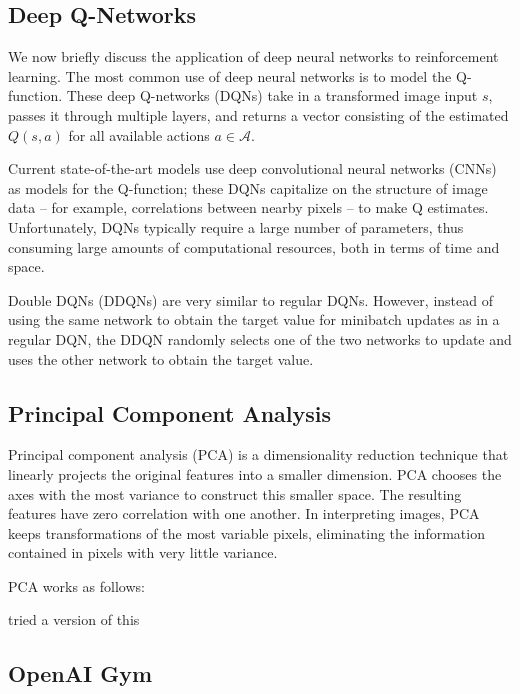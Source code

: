\documentclass[11pt]{article}
\begin{document}
\subsection{Deep Q-Networks}

We now briefly discuss the application of deep neural networks to reinforcement learning. The most common use of deep neural networks is to model the Q-function. These deep Q-networks (DQNs) take in a transformed image input $s$, passes it through multiple layers, and returns a vector consisting of the estimated $Q(s, a)$ for all available actions $a \in \mathcal{A}$. 

Current state-of-the-art models \cite{mnih2013playing, mnih2015human} use deep convolutional neural networks (CNNs) as models for the Q-function; these DQNs capitalize on the structure of image data -- for example, correlations between nearby pixels -- to make Q estimates. Unfortunately, DQNs typically require a large number of parameters, thus consuming large amounts of computational resources, both in terms of time and space.

Double DQNs (DDQNs) \cite{van2016deep} are very similar to regular DQNs. However, instead of using the same network to obtain the target value for minibatch updates as in a regular DQN, the DDQN randomly selects one of the two networks to update and uses the other network to obtain the target value.


\subsection{Principal Component Analysis}

Principal component analysis (PCA) is a dimensionality reduction technique that linearly projects the original features into a smaller dimension. PCA chooses the axes with the most variance to construct this smaller space. The resulting features have zero correlation with one another. In interpreting images, PCA keeps transformations of the most variable pixels, eliminating the information contained in pixels with very little variance.

PCA works as follows: 

\cite{kishima2013reduction} tried a version of this

\subsection{OpenAI Gym}
\end{document}
